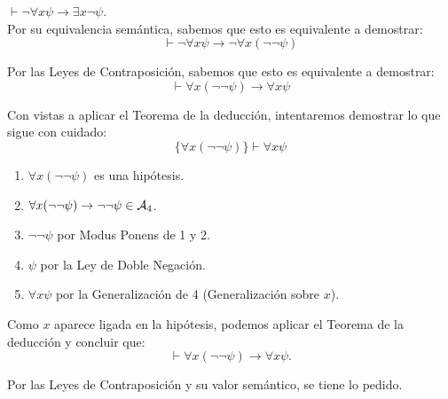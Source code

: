 \begin{ejercicio}\label{ej:2.10}
    $\vdash \neg \forall x \psi \rightarrow \exists x \neg \psi$.\\

    Por su equivalencia semántica, sabemos que esto es equivalente a demostrar:
    \begin{equation*}
        \vdash \neg \forall x \psi \rightarrow \neg\forall x(\neg\neg\psi)
    \end{equation*}

    Por las Leyes de Contraposición, sabemos que esto es equivalente a demostrar:
    \begin{equation*}
        \vdash \forall x(\neg\neg\psi) \rightarrow \forall x \psi
    \end{equation*}

    Con vistas a aplicar el Teorema de la deducción, intentaremos demostrar lo que sigue con cuidado:
    \begin{equation*}
        \{\forall x(\neg\neg\psi)\} \vdash \forall x \psi
    \end{equation*}
    \begin{enumerate}
        \item $\forall x(\neg\neg\psi)$ es una hipótesis.
        \item $\forall x(\neg\neg\psi) \rightarrow \neg\neg\psi\in \mathcal{A}_4$.
        \item $\neg\neg\psi$ por Modus Ponens de 1 y 2.
        \item $\psi$ por la Ley de Doble Negación.
        \item $\forall x\psi$ por la Generalización de 4 \qquad (Generalización sobre $x$).
    \end{enumerate}

    Como $x$ aparece ligada en la hipótesis, podemos aplicar el Teorema de la deducción y concluir que:
    \begin{equation*}
        \vdash \forall x(\neg\neg\psi) \rightarrow \forall x \psi.
    \end{equation*}

    Por las Leyes de Contraposición y su valor semántico, se tiene lo pedido.
\end{ejercicio}

